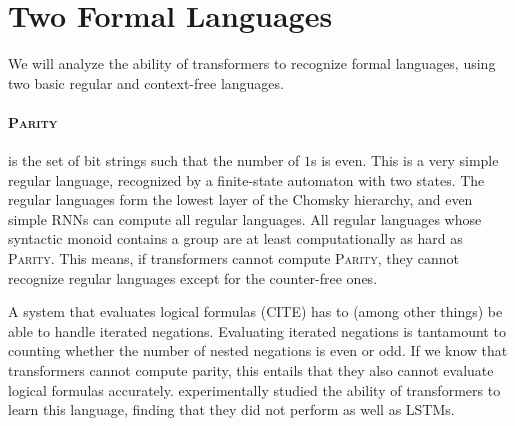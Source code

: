 \documentclass[11pt,a4paper]{article}
\begin{document}
\section{Two Formal Languages} %

We will analyze the ability of transformers to recognize formal languages, using two basic regular and context-free languages.


\paragraph{\textsc{Parity}} is the set of bit strings such that the number of $1$s is even.
This is a very simple regular language, recognized by a finite-state automaton with two states.
The regular languages form the lowest layer of the Chomsky hierarchy, and even simple RNNs can compute all regular languages.
All regular languages whose syntactic monoid contains a group are at least computationally as hard as \textsc{Parity}.
This means, if transformers cannot compute \textsc{Parity}, they cannot recognize regular languages except for the counter-free ones.




A system that evaluates logical formulas (CITE) has to (among other things) be able to handle iterated negations.
Evaluating iterated negations is tantamount to counting whether the number of nested negations is even or odd.
If we know that transformers cannot compute parity, this entails that they also cannot evaluate logical formulas accurately.
\cite{tran2018importance} experimentally studied the ability of transformers to learn this language, finding that they did not perform as well as LSTMs.


\end{document}
